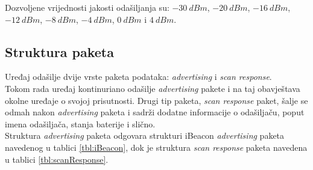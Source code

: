 Dozvoljene vrijednosti jakosti odašiljanja su: $\SI{-30}{dBm}$, $\SI{-20}{dBm}$, $\SI{-16}{dBm}$, $\SI{-12}{dBm}$, $\SI{-8}{dBm}$, $\SI{-4}{dBm}$, $\SI{0}{dBm}$ i $\SI{4}{dBm}$.


\subsection*{Struktura paketa}
Uređaj odašilje dvije vrste paketa podataka: \textit{advertising} i \textit{scan response}.
\\
Tokom rada uređaj kontinuriano odašilje \textit{advertising} pakete i na taj obavještava okolne uređaje o svojoj prisutnosti. 
Drugi tip paketa, \textit{scan response} paket, šalje se odmah nakon \textit{advertising} paketa i sadrži dodatne informacije o odašiljaču, poput imena odašiljača, stanja baterije i slično.
\\

Struktura \textit{advertising} paketa odgovara strukturi iBeacon \textit{advertising} paketa navedenog u tablici \ref{tbl:iBeacon}, dok je struktura \textit{scan response} paketa navedena u tablici \ref{tbl:scanResponse}.
\\

